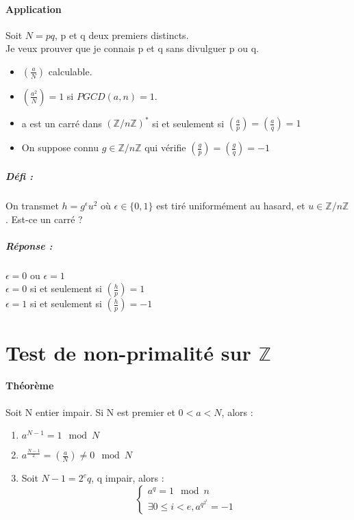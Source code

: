 \documentclass[12pt,a4paper]{report}
\begin{document}
\paragraph{Application\\}
Soit $N=pq$, p et q deux premiers distincts.\\
Je veux prouver que je connais p et q sans divulguer p ou q.
\begin{itemize}
\item $ \displaystyle \left(\frac{a}{N}\right)$ calculable.
\item $  \displaystyle \left(\frac{a^2}{N}\right) = 1$ si $ PGCD(a,n)=1$.
\item a est un carré dans $(\mathbb{Z}/n\mathbb{Z})^*$ si et seulement si $ \displaystyle \left(\frac{a}{p}\right) =  \displaystyle \left(\frac{a}{q}\right)=1$
\item On suppose connu $ g \in \mathbb{Z}/n\mathbb{Z}$ qui vérifie $ \displaystyle \left(\frac{g}{p}\right)= \displaystyle \left(\frac{g}{q}\right)=-1$
\end{itemize}
\subparagraph{Défi :} On transmet $h=g^{\epsilon}u^2$ où $\epsilon \in \{0,1\}$ est tiré uniformément au hasard, et $u \in \mathbb{Z}/n\mathbb{Z}$. Est-ce un carré ?
\subparagraph{Réponse :} $ \epsilon = 0 $ ou $ \epsilon = 1$\\
$\epsilon = 0 $ si et seulement si $  \displaystyle \left(\frac{h}{p}\right)=1$\\
$ \epsilon = 1 $ si et seulement si $  \displaystyle \left(\frac{h}{p}\right)=-1$
\section{Test de non-primalité sur $\mathbb{Z}$}
\paragraph{Théorème\\}
Soit N entier impair.
Si N est premier et $ 0 < a< N$, alors :
\begin{enumerate}
\item $a^{N-1} = 1 \mod N$
\item $a^{\frac{N-1}{2}} =  \displaystyle \left(\frac{a}{N}\right)\neq 0 \mod N $
\item Soit $N-1 = 2^eq$, q impair, alors :
$$ \left\{\begin{array}{l}
a^q = 1 \mod n \\
\exists 0\leqslant i < e, a^{q^{2^i}} = -1 \end{array}\right. $$
\end{enumerate}
\end{document}
